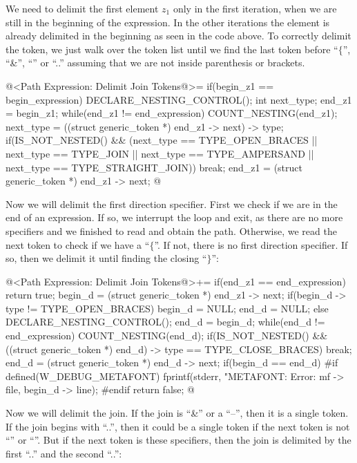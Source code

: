 We need to delimit the first element $z_1$ only in the first
iteration, when we are still in the beginning of the expression. In
the other iterations the element is already delimited in the beginning
as seen in the code above. To correctly delimit the token, we just
walk over the token list until we find the last token before ``$\{$'',
``\&'', ``\-\-'' or ``..'' assuming that we are not inside parenthesis or
brackets.

\iniciocodigo
@<Path Expression: Delimit Join Tokens@>=
if(begin_z1 == begin_expression){
  DECLARE_NESTING_CONTROL();
  int next_type;
  end_z1 = begin_z1;
  while(end_z1 != end_expression){
    COUNT_NESTING(end_z1);
    next_type = ((struct generic_token *) end_z1 -> next) -> type;
    if(IS_NOT_NESTED() &&
       (next_type == TYPE_OPEN_BRACES || next_type == TYPE_JOIN ||
        next_type == TYPE_AMPERSAND || next_type == TYPE_STRAIGHT_JOIN))
      break;
    end_z1 = (struct generic_token *) end_z1 -> next;
  }
}
@
\fimcodigo

Now we will delimit the first direction specifier. First we check if
we are in the end of an expression. If so, we interrupt the loop and
exit, as there are no more specifiers and we finished to read and
obtain the path. Otherwise, we read the next token to check if we have
a ``$\{$''. If not, there is no first direction specifier.  If so, then
we delimit it until finding the closing ``$\}$'':

\iniciocodigo
@<Path Expression: Delimit Join Tokens@>+=
if(end_z1 == end_expression)
  return true;
begin_d = (struct generic_token *) end_z1 -> next;
if(begin_d -> type != TYPE_OPEN_BRACES){
  begin_d = NULL;
  end_d = NULL;
}
else{
  DECLARE_NESTING_CONTROL();
  end_d = begin_d;
  while(end_d != end_expression){
    COUNT_NESTING(end_d);
    if(IS_NOT_NESTED() &&
       ((struct generic_token *) end_d) -> type == TYPE_CLOSE_BRACES)
      break;
    end_d = (struct generic_token *) end_d -> next;
  }
  if(begin_d == end_d){
#if defined(W_DEBUG_METAFONT)
    fprintf(stderr, "METAFONT: Error: %
            mf -> file, begin_d -> line);
#endif
    return false;
  }
}
@
\fimcodigo

Now we will delimit the join. If the join is ``\&'' or a ``--'', then
it is a single token. If the join begins with ``..'', then it could be
a single token if the next token is not ``'' or
``''. But if the next token is these specifiers,
then the join is delimited by the first ``..'' and the second ``..'':

